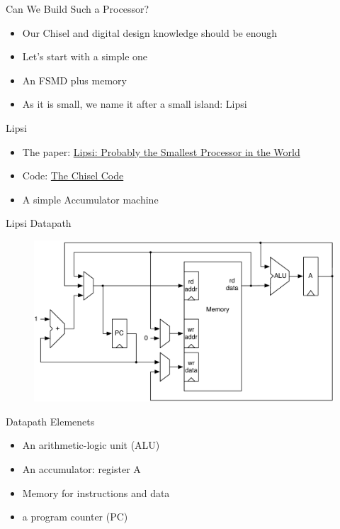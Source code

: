 \begin{frame}[fragile]{Can We Build Such a Processor?}
\begin{itemize}
\item Our Chisel and digital design knowledge should be enough
\item Let's start with a simple one
\item An FSMD plus memory
\item As it is small, we  name it after a small island: Lipsi
\end{itemize}
\end{frame}

\begin{frame}[fragile]{Lipsi}
\begin{itemize}
\item The paper: \href{https://www.jopdesign.com/doc/lipsi.pdf}{Lipsi: Probably the Smallest Processor in the World}
\item Code: \href{https://github.com/schoeberl/lipsi}{The Chisel Code}
\item A simple Accumulator machine
\end{itemize}
\end{frame}


\begin{frame}[fragile]{Lipsi Datapath}
\begin{figure}
  \includegraphics[scale=0.5]{../figures/lipsi}
\end{figure}
\end{frame}

\begin{frame}[fragile]{Datapath Elemenets}
\begin{itemize}
\item An arithmetic-logic unit (ALU)
\item An accumulator: register A
\item Memory for instructions and data
\item a program counter (PC)
\end{itemize}
\end{frame}

